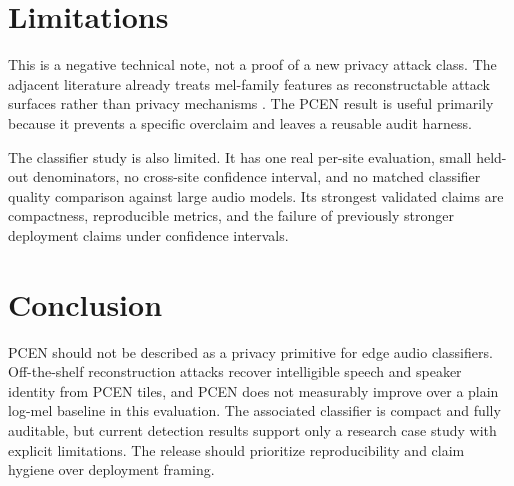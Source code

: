 \documentclass[twocolumn]{article}
\begin{document}
\section{Limitations}

This is a negative technical note, not a proof of a new privacy attack class.
The adjacent literature already treats mel-family features as reconstructable
attack surfaces rather than privacy mechanisms \cite{mestiri2024privacy,
safeear2024}. The PCEN result is useful primarily because it prevents a
specific overclaim and leaves a reusable audit harness.

The classifier study is also limited. It has one real per-site evaluation,
small held-out denominators, no cross-site confidence interval, and no matched
classifier quality comparison against large audio models. Its strongest
validated claims are compactness, reproducible metrics, and the failure of
previously stronger deployment claims under confidence intervals.

\section{Conclusion}

PCEN should not be described as a privacy primitive for edge audio classifiers.
Off-the-shelf reconstruction attacks recover intelligible speech and speaker
identity from PCEN tiles, and PCEN does not measurably improve over a plain
log-mel baseline in this evaluation. The associated classifier is compact and
fully auditable, but current detection results support only a research case
study with explicit limitations. The release should prioritize reproducibility
and claim hygiene over deployment framing.


\end{document}
